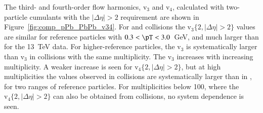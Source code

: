 \documentclass[cernpreprint,texlive=2014,txfonts,UKenglish]{latex/atlasdoc}
\begin{document}
The third- and fourth-order flow harmonics, $\mathrm{v}_3$ and $\mathrm{v}_4$, calculated with two-particle cumulants  with the $|\Delta\eta|>2$ requirement are shown in Figure~\ref{fig:comp_pPb_PbPb_v34}.   For \pPb and \PbPb collisions the $\mathrm{v}_3\{2,|\Delta\eta|>2\}$ values are similar for reference particles with $0.3< \pT < 3.0$~GeV, and much larger than for the 13~TeV \pp data. For higher-\pT reference particles, the  \PbPb $\mathrm{v}_3$ is systematically larger than $\mathrm{v}_3$ in \pPb collisions with  the same multiplicity. The $\mathrm{v}_3$ increases with increasing multiplicity. A weaker increase is seen for  $\mathrm{v}_4\{2,|\Delta\eta|>2\}$, but at high multiplicities the values observed in \PbPb collisions are systematically larger than in \pPb, for two \pT ranges of reference particles. For multiplicities below 100, where the $\mathrm{v}_4\{2,|\Delta\eta|>2\}$ can also be obtained from \pp collisions, no system dependence is seen. 

\end{document}
